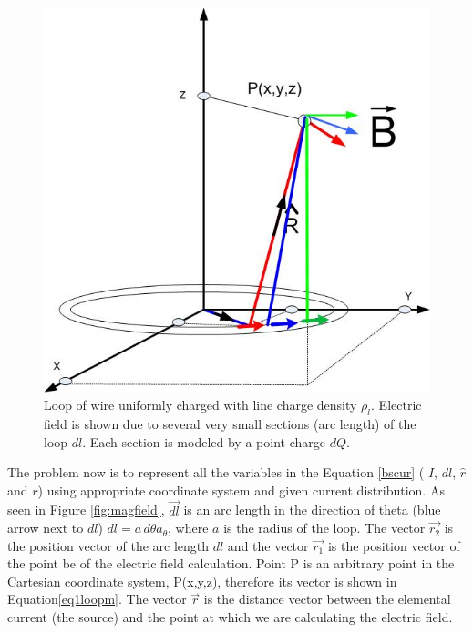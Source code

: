\documentclass{ximera}
\begin{document}
\begin{figure}[htbp]
\begin{center}
\includegraphics[scale=0.4]{../jpg/bscurrent.jpg}
\end{center}
\caption{Loop of wire uniformly charged with line charge density $\rho_l$. Electric field is shown due to several very small sections (arc length) of the loop $dl$.
Each section is modeled by a point charge $dQ$.}
\label{bscur1}
\end{figure}



The problem now  is to represent all the variables in the Equation \ref{bscur}  ( $I$, $dl$, $\hat{r}$ and $r$) using  appropriate coordinate system and given current distribution.
 As seen in Figure \ref{fig:magfield}, $\vec{dl}$ is an arc length in the direction of theta (blue arrow next to $dl$) $dl=a\, d\theta a_{\theta}$, where $ a$ is the radius of the loop. The vector $\vec{r_2}$ is the position vector of the arc length $dl$ and the vector $\vec{r_1}$  is the position vector of the point be  of the electric field calculation. Point P is an arbitrary point in the Cartesian coordinate system, P(x,y,z), therefore its  vector is shown in Equation\ref{eq1loopm}.  The vector $\vec{r}$ is the distance vector between the elemental current (the source) and the point at which we are calculating the electric field. 
\end{document}
